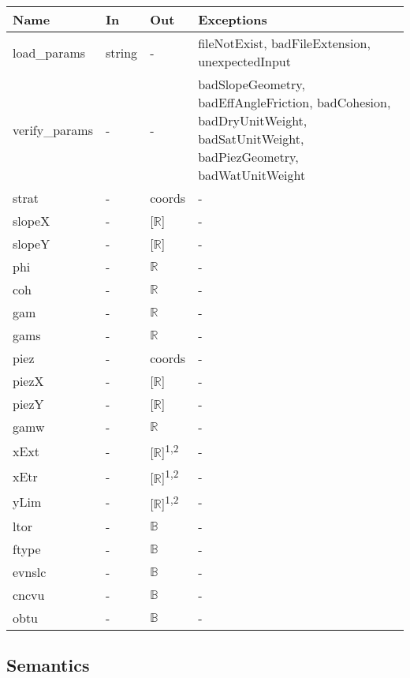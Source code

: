 \documentclass[12pt, titlepage]{article}
\begin{document}
\begin{center}
\renewcommand*{\arraystretch}{1.5}
\begin{tabular}{p{}  p{}  p{}  
p{} } \hline 

  \textbf{Name} & \textbf{In} & \textbf{Out} & \textbf{Exceptions} \\ \hline

   load\_params & string & - & 
   fileNotExist, badFileExtension, unexpectedInput  \\
   
   verify\_params & - & - & 
   badSlopeGeometry, badEffAngleFriction, badCohesion, badDryUnitWeight, 
   badSatUnitWeight, badPiezGeometry, badWatUnitWeight \\
   
   strat & - & coords & - \\
   slopeX & - & [$\mathbb{R}$] & - \\
   slopeY & - & [$\mathbb{R}$] & - \\
   phi & - & $\mathbb{R}$ & - \\
   coh & - & $\mathbb{R}$ & - \\
   gam & - & $\mathbb{R}$ & - \\
   gams & - & $\mathbb{R}$ & - \\
   piez & - & coords & - \\
   piezX & - & [$\mathbb{R}$] & - \\
   piezY & - & [$\mathbb{R}$] & - \\
   gamw & - & $\mathbb{R}$ & - \\
   xExt & - & [$\mathbb{R}$]\textsuperscript{1,2} & - \\
   xEtr & - & [$\mathbb{R}$]\textsuperscript{1,2} & - \\
   yLim & - & [$\mathbb{R}$]\textsuperscript{1,2} & - \\
   ltor & - & $\mathbb{B}$ & - \\
   ftype & - & $\mathbb{B}$ & - \\
   evnslc & - & $\mathbb{B}$ & - \\
   cncvu & - & $\mathbb{B}$ & - \\
   obtu & - & $\mathbb{B}$ & - \\
   \hline

\end{tabular}
\end{center}

\subsection{Semantics}
\end{document}
